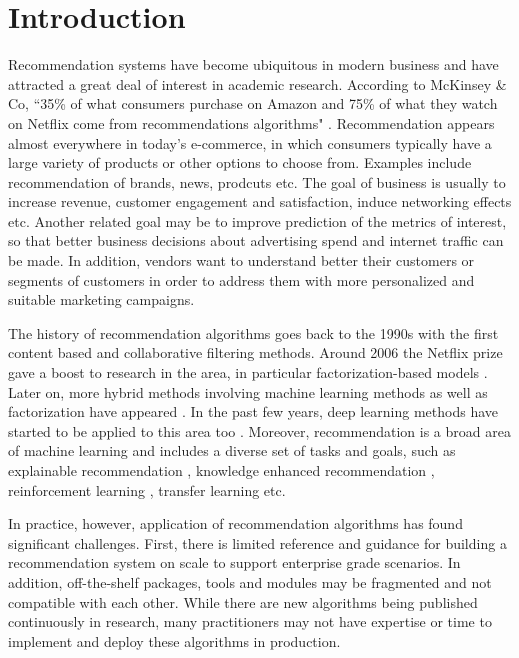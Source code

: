 \section{Introduction}

Recommendation systems have become ubiquitous in modern business and have attracted a great deal of interest in academic research.
According to McKinsey \& Co,
“35\% of what consumers purchase on Amazon and 75\% of what they watch on Netflix come from recommendations algorithms" 
\cite{mckinsey}.
Recommendation appears almost everywhere in today's e-commerce, in which consumers typically have a large variety of products or other
options to choose from. Examples include recommendation of brands, news, prodcuts etc. The goal of business is usually to increase revenue,
customer engagement and satisfaction, induce networking effects etc. Another related goal may be to improve prediction of the metrics of interest, 
so that better business decisions about advertising spend and internet traffic can be made. In addition, vendors want to understand better their customers
or segments of customers in order to address them with more personalized and suitable marketing campaigns.

The history of recommendation algorithms goes back to the 1990s \cite{Tapestry, GroupLens}
with the first content based and collaborative filtering methods.
Around 2006 the Netflix prize \cite{} gave a boost to research in the area, in particular 
factorization-based models \cite{Koren,SVD++,PMF}.
Later on, more hybrid methods involving machine learning methods as well as factorization have appeared
\cite{FM,pairwise}.
In the past few years, deep learning methods have started to be applied to this area too
\cite{PNN,WideDeep,DeepFM,xDeepFM,NCF}.
Moreover, recommendation is a broad area of machine learning and includes a diverse set of tasks and goals, such as 
explainable recommendation \cite{}, knowledge enhanced recommendation \cite{},
reinforcement learning \cite{}, transfer learning \cite{} etc.

In practice, however, application of recommendation algorithms has found significant challenges. 
First, there is limited reference and guidance for building a recommendation system on scale to support
enterprise grade scenarios. In addition, off-the-shelf packages, tools and modules may be fragmented and not compatible with
each other. While there are new algorithms being published continuously in research, many practitioners may not have 
expertise or time to implement and deploy these algorithms in production.

